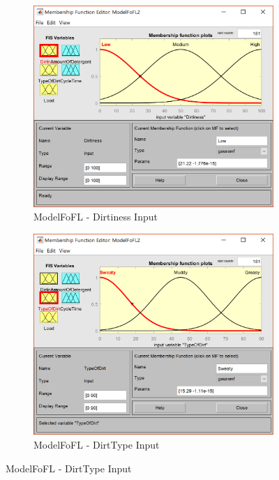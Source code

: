\documentclass[11pt]{article}
\begin{document}
\begin{enumerate}[label=(\alph*)]
  \begin{figure}[ht!]
  \centering
  \begin{subfigure}{.5\textwidth}
    \centering
    \includegraphics[width=.9\linewidth]{res/image3_dirtiness}
    \caption{ModelFoFL - Dirtiness Input}
    \label{fig:sub1}
  \end{subfigure}%
  \begin{subfigure}{.5\textwidth}
    \centering
    \includegraphics[width=.9\linewidth]{res/image3_dirttype}
    \caption{ModelFoFL - DirtType Input}
    \label{fig:sub2}
  \end{subfigure}
  \end{figure}


\end{enumerate}
\end{document}
